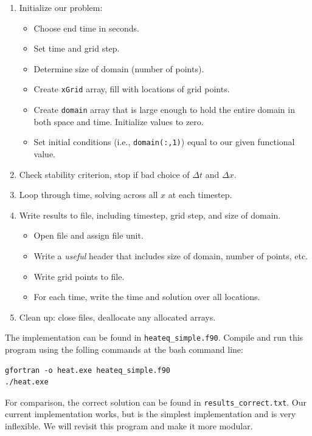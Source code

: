 \documentclass[11pt, letterpaper]{article}
\begin{document}
\begin{enumerate}
\item Initialize our problem:
  \begin{itemize}
  \item Choose end time in seconds.
  \item Set time and grid step.
  \item Determine size of domain (number of points).
  \item Create {\tt xGrid} array, fill with locations of grid points.
  \item Create {\tt domain} array that is large enough to hold the
    entire domain in both space and time. Initialize values to zero.
  \item Set initial conditions (i.e., {\tt domain(:,1)}) equal to our
    given functional value.
  \end{itemize}
\item Check stability criterion, stop if bad choice of $\Delta t$ and $\Delta x$.
\item Loop through time, solving across all $x$ at each timestep.
\item Write results to file, including timestep, grid step, and size of domain.
  \begin{itemize}
  \item Open file and assign file unit.
  \item Write a \emph{useful} header that includes size of domain, number of
    points, etc.
  \item Write grid points to file.
  \item For each time, write the time and solution over all locations.
  \end{itemize}

\item Clean up: close files, deallocate any allocated arrays.
  
\end{enumerate}

The implementation can be found in {\tt heateq\_simple.f90}.  Compile and run
this program using the folling commands at the bash command line:

\begin{verbatim}
gfortran -o heat.exe heateq_simple.f90 
./heat.exe 
\end{verbatim}

For comparison, the correct solution can be found in {\tt results\_correct.txt}.
Our current implementation works, but is the simplest implementation and is
very inflexible.  We will revisit this program and make it more modular.



\end{document}
